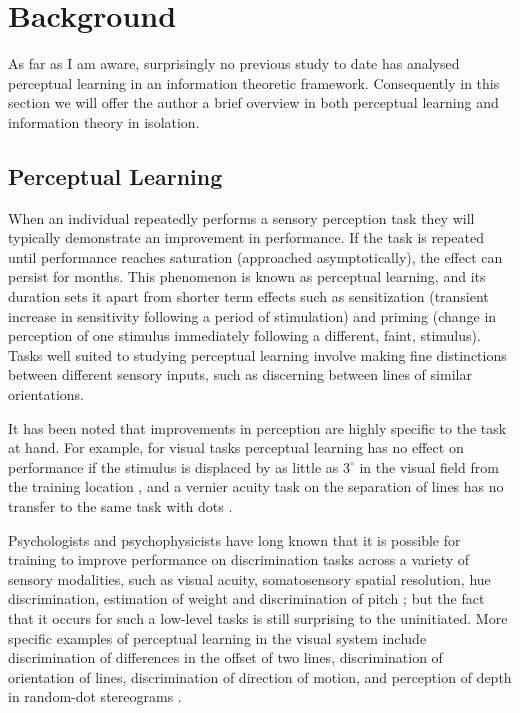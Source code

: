 \section{Background}
\label{ch:bg}

As far as I am aware, surprisingly no previous study to date has analysed perceptual learning in an information theoretic framework.
Consequently in this section we will offer the author a brief overview in both perceptual learning and information theory in isolation.

\subsection{Perceptual Learning}
\label{sec:bgpl}

When an individual repeatedly performs a sensory perception task they will typically demonstrate an improvement in performance. If the task is repeated until performance reaches saturation (approached asymptotically), the effect can persist for months. This phenomenon is known as perceptual learning, and its duration sets it apart from shorter term effects such as sensitization (transient increase in sensitivity following a period of stimulation) and priming (change in perception of one stimulus immediately following a different, faint, stimulus).
Tasks well suited to studying perceptual learning involve making fine distinctions between different sensory inputs, such as discerning between lines of similar orientations.

It has been noted that improvements in perception are highly specific to the task at hand. For example, for visual tasks perceptual learning has no effect on performance if the stimulus is displaced by as little as $3^\circ$ in the visual field from the training location \cite{Gilbert1994}, 
and a vernier acuity task on the separation of lines has no transfer to the same task with dots \cite{Poggio1992}.


Psychologists and psychophysicists have long known that it is possible for training to improve performance on discrimination tasks across a variety of sensory modalities, such as visual acuity, somatosensory spatial resolution, hue discrimination, estimation of weight and discrimination of pitch \cite{Gilbert2001}; but the fact that it occurs for such a low-level tasks is still surprising to the uninitiated. More specific examples of perceptual learning in the visual system include discrimination of differences in the offset of two lines, discrimination of orientation of lines, discrimination of direction of motion, and perception of depth in random-dot stereograms \cite{Gilbert2001,Fine2002}.

